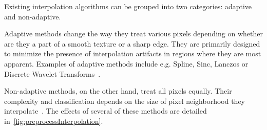 Existing interpolation algorithms can be grouped into two categories: adaptive and non-adaptive.

Adaptive methods change the way they treat various pixels depending on whether are they a part of a smooth texture or a sharp edge. They are primarily designed to minimize the presence of interpolation artifacts in regions where they are most apparent. Examples of adaptive methods include e.g. Spline, Sinc, Lanczos or Discrete Wavelet Transforms~\cite{interpolation}.

Non-adaptive methods, on the other hand, treat all pixels equally. Their complexity and classification depends on the size of pixel neighborhood they interpolate~\cite{interpolation}. The effects of several of these methods are detailed in~\cref{fig:preprocessInterpolation}.

